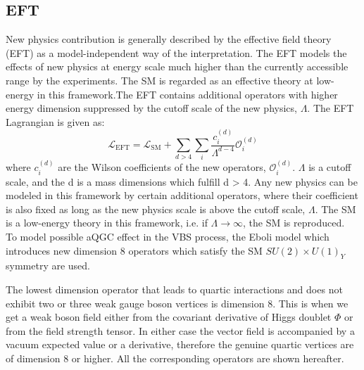 \subsection{EFT}
New physics contribution is generally described by the effective field theory (EFT) as a model-independent way of the interpretation.
The EFT models the effects of new physics at energy scale much higher than the currently accessible range by the experiments. The SM is regarded as an effective theory at low-energy in this framework.The EFT contains additional operators with higher energy dimension suppressed by the cutoff scale of the new physics, $\Lambda$.
The EFT Lagrangian is given as:
\begin{equation}
\mathcal{L}_{\mathrm{EFT}}=\mathcal{L}_{\mathrm{SM}}+\sum_{d>4} \sum_{i} \frac{c_{i}^{(d)}}{\Lambda^{d-4}} \mathcal{O}_{i}^{(d)}
\end{equation}
where $c_{i}^{(d)}$ are the Wilson coefficients of the new operators, $\mathcal{O}_{i}^{(d)}$.
$\Lambda$ is a cutoff scale, and the d is a mass dimensions which fulfill d > 4.
Any new physics can be modeled in this framework by certain additional operators, where their coefficient is also fixed as long as the new physics scale is above the cutoff scale, $\Lambda$. The SM is a low-energy theory in this framework, i.e. if $\Lambda \rightarrow \infty$, the SM is reproduced.
\\

To model possible aQGC effect in the VBS process, the Eboli model \cite{eboli2006p} which introduces new dimension 8 operators which satisfy the SM $SU(2)\times U(1)_Y$ symmetry are used. 

The lowest dimension operator that leads to quartic interactions and does not exhibit two or three weak gauge boson vertices is dimension 8. 
This is when we get a weak boson field either from the covariant derivative of Higgs doublet $\Phi$ or from the field strength tensor. 
In either case the vector field is accompanied by a vacuum expected value or a derivative, therefore the genuine quartic vertices are of dimension 8 or higher.
All the corresponding operators are shown hereafter.

